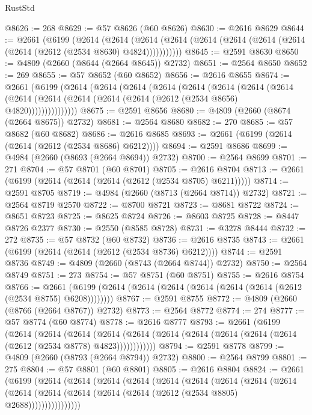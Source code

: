 \begin{lexlean}{RustStd}
\begin{coremodule}
@8626 := 268
@8629 := @57 @8626 (@60 @8626)
@8630 := @2616 @8629
@8644 := @2661
    (@6199
      (@2614
        (@2614
          (@2614 (@2614 (@2614 (@2614 (@2614 (@2614 (@2614 (@2612 (@2534 @8630) @4824)))))))))))
@8645 := @2591 @8630
@8650 := @4809 (@2660 (@8644 (@2664 @8645)) @2732)
@8651 := @2564 @8650
@8652 := 269
@8655 := @57 @8652 (@60 @8652)
@8656 := @2616 @8655
@8674 := @2661
    (@6199
      (@2614
        (@2614
          (@2614
            (@2614
              (@2614
                (@2614
                  (@2614
                    (@2614
                      (@2614 (@2614 (@2614 (@2614 (@2614 (@2612 (@2534 @8656) @4820)))))))))))))))
@8675 := @2591 @8656
@8680 := @4809 (@2660 (@8674 (@2664 @8675)) @2732)
@8681 := @2564 @8680
@8682 := 270
@8685 := @57 @8682 (@60 @8682)
@8686 := @2616 @8685
@8693 := @2661 (@6199 (@2614 (@2614 (@2612 (@2534 @8686) @6212))))
@8694 := @2591 @8686
@8699 := @4984 (@2660 (@8693 (@2664 @8694)) @2732)
@8700 := @2564 @8699
@8701 := 271
@8704 := @57 @8701 (@60 @8701)
@8705 := @2616 @8704
@8713 := @2661 (@6199 (@2614 (@2614 (@2614 (@2612 (@2534 @8705) @6211)))))
@8714 := @2591 @8705
@8719 := @4984 (@2660 (@8713 (@2664 @8714)) @2732)
@8721 := @2564 @8719 @2570
@8722 := @8700 @8721
@8723 := @8681 @8722
@8724 := @8651 @8723
@8725 := @8625 @8724
@8726 := @8603 @8725
@8728 := @8447 @8726 @2377
@8730 := @2550 (@8585 @8728)
@8731 := @3278 @8444
@8732 := 272
@8735 := @57 @8732 (@60 @8732)
@8736 := @2616 @8735
@8743 := @2661 (@6199 (@2614 (@2614 (@2612 (@2534 @8736) @6212))))
@8744 := @2591 @8736
@8749 := @4809 (@2660 (@8743 (@2664 @8744)) @2732)
@8750 := @2564 @8749
@8751 := 273
@8754 := @57 @8751 (@60 @8751)
@8755 := @2616 @8754
@8766 := @2661 (@6199 (@2614 (@2614 (@2614 (@2614 (@2614 (@2614 (@2612 (@2534 @8755) @6208))))))))
@8767 := @2591 @8755
@8772 := @4809 (@2660 (@8766 (@2664 @8767)) @2732)
@8773 := @2564 @8772
@8774 := 274
@8777 := @57 @8774 (@60 @8774)
@8778 := @2616 @8777
@8793 := @2661
    (@6199
      (@2614
        (@2614
          (@2614
            (@2614 (@2614 (@2614 (@2614 (@2614 (@2614 (@2614 (@2612 (@2534 @8778) @4823))))))))))))
@8794 := @2591 @8778
@8799 := @4809 (@2660 (@8793 (@2664 @8794)) @2732)
@8800 := @2564 @8799
@8801 := 275
@8804 := @57 @8801 (@60 @8801)
@8805 := @2616 @8804
@8824 := @2661
    (@6199
      (@2614
        (@2614
          (@2614
            (@2614
              (@2614
                (@2614
                  (@2614
                    (@2614
                      (@2614
                        (@2614
                          (@2614 (@2614 (@2614 (@2614 (@2612 (@2534 @8805) @2688))))))))))))))))

\end{coremodule}
\end{lexlean}
